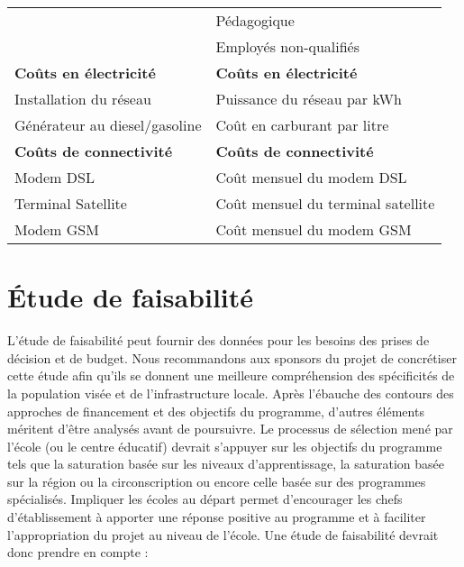 \documentclass[12pt]{article}
\begin{document}
\begin{longtable}{|l|l|}
                                                   &  Pédagogique                                        \\
                                                   &  Employés non-qualifiés                             \\
\hline
 \textbf{Coûts en électricité}                     &  \textbf{Coûts en électricité}                      \\
 Installation du réseau                            &  Puissance du réseau par kWh                        \\
 Générateur au diesel/gasoline                     &  Coût en carburant par litre                        \\
\hline
 \textbf{Coûts de connectivité}                    &  \textbf{Coûts de connectivité}                     \\
 Modem DSL                                         &  Coût mensuel du modem DSL                          \\
 Terminal Satellite                                &  Coût mensuel du terminal satellite                 \\
 Modem GSM                                         &  Coût mensuel du modem GSM                          \\
\hline
\end{longtable}
\section{Étude de faisabilité}
\label{sec-7}


L'étude de faisabilité peut fournir des données pour les besoins des prises
de décision et de budget. Nous recommandons aux sponsors du projet de
concrétiser cette étude afin qu'ils se donnent une meilleure compréhension
des spécificités de la population visée et de l'infrastructure
locale. Après l'ébauche des contours des approches de financement et des
objectifs du programme, d'autres éléments méritent d'être analysés avant de
poursuivre. Le processus de sélection mené par l'école (ou le centre
éducatif) devrait s'appuyer sur les objectifs du programme tels que la
saturation basée sur les niveaux d'apprentissage, la saturation basée sur
la région ou la circonscription ou encore celle basée sur des programmes
spécialisés. Impliquer les écoles au départ permet d'encourager les chefs
d'établissement à apporter une réponse positive au programme et à
faciliter l'appropriation du projet au niveau de l'école. Une étude de
faisabilité devrait donc prendre en compte :
\end{document}
